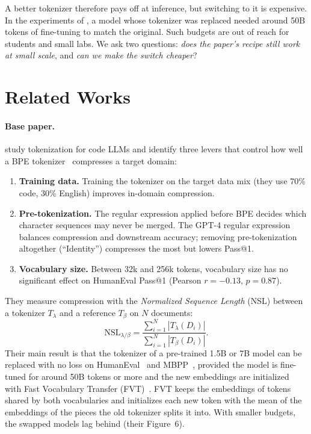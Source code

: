 \documentclass[11pt,a4paper]{article}
\begin{document}
A better tokenizer therefore pays off at inference, but switching to it is expensive. In the experiments of \citet{dagan2024tokenizer}, a model whose tokenizer was replaced needed around 50B tokens of fine-tuning to match the original. Such budgets are out of reach for students and small labs. We ask two questions: \emph{does the paper's recipe still work at small scale}, and \emph{can we make the switch cheaper}?

\section{Related Works}
\label{sec:related}

\paragraph{Base paper.} \citet{dagan2024tokenizer} study tokenization for code LLMs and identify three levers that control how well a BPE tokenizer~\citep{sennrich2016bpe} compresses a target domain:
\begin{enumerate}
  \item \textbf{Training data.} Training the tokenizer on the target data mix (they use 70\% code, 30\% English) improves in-domain compression.
  \item \textbf{Pre-tokenization.} The regular expression applied before BPE decides which character sequences may never be merged. The GPT-4 regular expression balances compression and downstream accuracy; removing pre-tokenization altogether (``Identity'') compresses the most but lowers Pass@1.
  \item \textbf{Vocabulary size.} Between 32k and 256k tokens, vocabulary size has no significant effect on HumanEval Pass@1 (Pearson $r=-0.13$, $p=0.87$).
\end{enumerate}
They measure compression with the \emph{Normalized Sequence Length} (NSL) between a tokenizer $T_\lambda$ and a reference $T_\beta$ on $N$ documents:
\begin{equation}
  \mathrm{NSL}_{\lambda/\beta} = \frac{\sum_{i=1}^{N} |T_\lambda(D_i)|}{\sum_{i=1}^{N} |T_\beta(D_i)|}.
\end{equation}
Their main result is that the tokenizer of a pre-trained 1.5B or 7B model can be replaced with no loss on HumanEval~\citep{chen2021humaneval} and MBPP~\citep{austin2021mbpp}, provided the model is fine-tuned for around 50B tokens or more and the new embeddings are initialized with Fast Vocabulary Transfer (FVT)~\citep{gee2022fvt}. FVT keeps the embeddings of tokens shared by both vocabularies and initializes each new token with the mean of the embeddings of the pieces the old tokenizer splits it into. With smaller budgets, the swapped models lag behind (their Figure~6).
\end{document}
